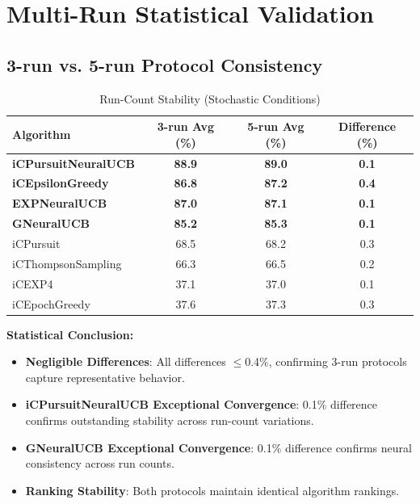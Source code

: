 \documentclass[12pt,a4paper]{article}
\newcommand{\success}[1]{\textcolor{accentgreen}{\textbf{#1}}}
\newcommand{\legacy}[1]{\textcolor{legacycolor}{\textbf{#1}}}
\newcommand{\neural}[1]{\textcolor{neuralcolor}{\textbf{#1}}}
\begin{document}
\section{Multi-Run Statistical Validation}

\subsection{3-run vs. 5-run Protocol Consistency}

\begin{table}[H]
\centering
\caption{Run-Count Stability (Stochastic Conditions)}
\label{tab:run-count}
\begin{tabular}{@{}lccc@{}}\toprule
\textbf{Algorithm} & \textbf{3-run Avg (\%)} & \textbf{5-run Avg (\%)} & \textbf{Difference (\%)} \\\midrule
\neural{iCPursuitNeuralUCB}   & \neural{88.9} & \neural{89.0} & \neural{0.1} \\
\success{iCEpsilonGreedy}   & \success{86.8} & \success{87.2} & \success{0.4} \\
\legacy{EXPNeuralUCB}       & \legacy{87.0} & \legacy{87.1} & \legacy{0.1} \\
\neural{GNeuralUCB}        & \neural{85.2} & \neural{85.3} & \neural{0.1} \\
iCPursuit                   & 68.5 & 68.2 & 0.3 \\
iCThompsonSampling          & 66.3 & 66.5 & 0.2 \\
iCEXP4                      & 37.1 & 37.0 & 0.1 \\
iCEpochGreedy               & 37.6 & 37.3 & 0.3 \\\bottomrule
\end{tabular}
\end{table}

\textbf{Statistical Conclusion:}
\begin{itemize}
\item \success{Negligible Differences}: All differences $\leq$0.4\%, confirming 3-run protocols capture representative behavior.
\item \neural{iCPursuitNeuralUCB Exceptional Convergence}: 0.1\% difference confirms outstanding stability across run-count variations.
\item \neural{GNeuralUCB Exceptional Convergence}: 0.1\% difference confirms neural consistency across run counts.
\item \success{Ranking Stability}: Both protocols maintain identical algorithm rankings.
\end{itemize}
\end{document}

